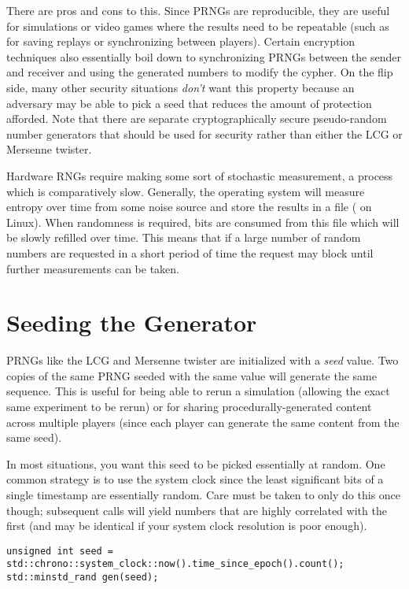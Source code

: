 There are pros and cons to this.
Since PRNGs are reproducible, they are useful for simulations or video games where the results need to be repeatable (such as for saving replays or synchronizing between players).
Certain encryption techniques also essentially boil down to synchronizing PRNGs between the sender and receiver and using the generated numbers to modify the cypher.
On the flip side, many other security situations \emph{don't} want this property because an adversary may be able to pick a seed that reduces the amount of protection afforded.
Note that there are separate cryptographically secure pseudo-random number generators that should be used for security rather than either the LCG or Mersenne twister.

Hardware RNGs require making some sort of stochastic measurement, a process which is comparatively slow.
Generally, the operating system will measure entropy over time from some noise source and store the results in a file ( on Linux).
When randomness is required, bits are consumed from this file which will be slowly refilled over time.
This means that if a large number of random numbers are requested in a short period of time the request may block until further measurements can be taken.

\section{Seeding the Generator}\label{sec:random-seed}

PRNGs like the LCG and Mersenne twister are initialized with a \emph{seed} value.
Two copies of the same PRNG seeded with the same value will generate the same sequence.
This is useful for being able to rerun a simulation (allowing the exact same experiment to be rerun) or for sharing procedurally-generated content across multiple players (since each player can generate the same content from the same seed).

In most situations, you want this seed to be picked essentially at random.
One common strategy is to use the system clock since the least significant bits of a single timestamp are essentially random.
Care must be taken to only do this once though; subsequent calls will yield numbers that are highly correlated with the first (and may be identical if your system clock resolution is poor enough).

\begin{lstlisting}
unsigned int seed = std::chrono::system_clock::now().time_since_epoch().count();
std::minstd_rand gen(seed);
\end{lstlisting}

